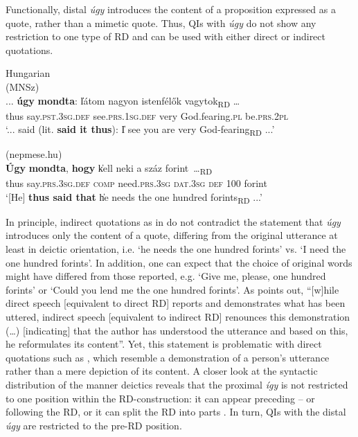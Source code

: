 \documentclass[output=paper,colorlinks,citecolor=brown]{langscibook}
\begin{document}
Functionally, distal \textit{úgy} introduces the content of a proposition expressed as a quote, rather than a mimetic quote. Thus, QIs with \textit{úgy} do not show any restriction to one type of RD and can be used with either direct  or indirect  quotations.

\ea\label{ex:teptiuk:24} Hungarian\\
\ea\label{ex:teptiuk:24a} (MNSz)\\
\gll ... \textbf{úgy} \textbf{mondta}: \|látom nagyon istenfélők vagytok\|\textsubscript{RD} …\\
 {} thus say.\textsc{pst}.3\textsc{sg.def} {\db}see.\textsc{prs}.1\textsc{sg.def} very God.fearing.\textsc{pl} be.\textsc{prs.2pl}\\
\glt ‘... said (lit. \textbf{said it thus}): \|I see you are very God-fearing\|\textsubscript{RD} ...’

\ex\label{ex:teptiuk:24b} (nepmese.hu)\\
\gll \textbf{Úgy} \textbf{mondta}, \textbf{hogy} \|kell neki a száz forint~…\|\textsubscript{RD}\\
 thus say.\textsc{prs.3sg.def} \textsc{comp} {\db}need.\textsc{prs.3sg} \textsc{dat.3sg} \textsc{def} 100 forint\\
\glt ‘[He] \textbf{thus said that} \|he needs the one hundred forints\|\textsubscript{RD} ...’
\z
\z

In principle, indirect quotations as in  do not contradict the statement that \textit{úgy} introduces only the content of a quote, differing from the original utterance at least in deictic orientation, i.e. ‘he needs the one hundred forints’ vs. ‘I need the one hundred forints’. In addition, one can expect that the choice of original words might have differed from those reported, e.g. ‘Give me, please, one hundred forints’ or ‘Could you lend me the one hundred forints’. As \citet[338]{Dömötör2001} points out, “[w]hile direct speech [equivalent to direct RD] reports and demonstrates what has been uttered, indirect speech [equivalent to indirect RD] renounces this demonstration (…) [indicating] that the author has understood the utterance and based on this, he reformulates its content”. Yet, this statement is problematic with direct quotations such as , which resemble a demonstration of a person’s utterance rather than a mere depiction of its content. A closer look at the syntactic distribution of the manner deictics reveals that the proximal \textit{így} is not restricted to one position within the RD-construction: it can appear preceding – or following  the RD, or it can split the RD into parts . In turn, QIs with the distal \textit{úgy} are restricted to the pre-RD position.
\end{document}
